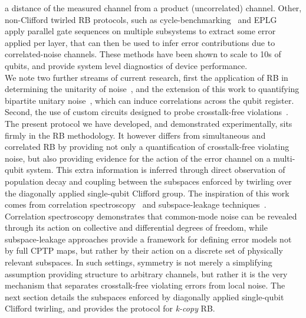 a distance of the measured channel from a product (uncorrelated) channel.
Other, non-Clifford twirled RB protocols, such as cycle-benchmarking~\cite{erhard_characterizing_2019} and EPLG~\cite{mckay_benchmarking_2023} apply parallel gate sequences on multiple subsystems to extract some error applied per layer, that can then be used to infer error contributions due to correlated-noise channels. These methods have been shown to scale to 10s of qubits, and provide system level diagnostics of device performance.\\
We note two further streams of current research, first the application of RB in
determining the unitarity of noise~\cite{wallman_estimating_2015}, and the
extension of this work to quantifying bipartite unitary
noise~\cite{girling_estimation_2022}, which can induce correlations across the
qubit register. Second, the use of custom circuits designed to probe
crosstalk-free violations~\cite{rudinger_probing_2019,
sarovar_detecting_2020,gulacsi_characterizing_2025}. \\
The present protocol we have developed, and demonstrated experimentally, sits firmly in the RB methodology. It however differs from simultaneous and correlated RB by providing not only a quantification of crosstalk-free violating noise, but also providing evidence for the action of the error channel on a multi-qubit system. This extra information is inferred through direct observation of population decay and coupling between the subspaces enforced by twirling over the diagonally applied single-qubit Clifford group.
The inspiration of this work comes from correlation spectroscopy~\cite{clements_lifetime-limited_2020, hainzer_correlation_2024}
and subspace-leakage techniques~\cite{sutherland_subspace_2025,helsen_new_2019}. Correlation spectroscopy demonstrates that common-mode noise can be
revealed through its action on collective and differential degrees of
freedom, while subspace-leakage approaches provide a framework for defining error models not by full CPTP maps, but rather by their action on a discrete set of physically relevant subspaces.
In such settings, symmetry is
not merely a simplifying assumption providing structure to arbitrary channels, but rather it is the very mechanism that separates
crosstalk-free violating errors from local noise. The next section details the subspaces enforced by diagonally applied single-qubit Clifford twirling, and provides the protocol for \emph{k-copy} RB.\\

